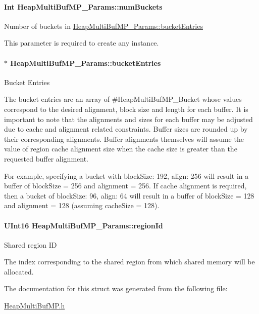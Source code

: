 \paragraph[{num\-Buckets}]{\setlength{\rightskip}{0pt plus 5cm}Int Heap\-Multi\-Buf\-M\-P\-\_\-\-Params\-::num\-Buckets}\label{struct_heap_multi_buf_m_p___params_a30eef328df3b8f69f50a013defb5fbb1}
Number of buckets in \hyperlink{struct_heap_multi_buf_m_p___params_ac130e0ad7fad30d9c759af90984dee8b}{Heap\-Multi\-Buf\-M\-P\-\_\-\-Params\-::bucket\-Entries} \begin{DoxyVerb}   This parameter is required to create any instance.\end{DoxyVerb}
\paragraph[{bucket\-Entries}]{$\ast$ Heap\-Multi\-Buf\-M\-P\-\_\-\-Params\-::bucket\-Entries}\label{struct_heap_multi_buf_m_p___params_ac130e0ad7fad30d9c759af90984dee8b}
Bucket Entries \begin{DoxyVerb}   The bucket entries are an array of #HeapMultiBufMP_Bucket whose values
   correspond to the desired alignment, block size and length for each
   buffer.  It is important to note that the alignments and sizes for each
   buffer may be adjusted due to cache and alignment related constraints.
   Buffer sizes are rounded up by their corresponding alignments.  Buffer
   alignments themselves will assume the value of region cache alignment
   size when the cache size is greater than the requested buffer alignment.

   For example, specifying a bucket with {blockSize: 192, align: 256} will
   result in a buffer of blockSize = 256 and alignment = 256.  If cache
   alignment is required, then a bucket of {blockSize: 96, align: 64} will
   result in a buffer of blockSize = 128 and alignment = 128 (assuming
   cacheSize = 128).\end{DoxyVerb}
\paragraph[{region\-Id}]{\setlength{\rightskip}{0pt plus 5cm}U\-Int16 Heap\-Multi\-Buf\-M\-P\-\_\-\-Params\-::region\-Id}\label{struct_heap_multi_buf_m_p___params_aa3c641a64db9b4ff0c93f9a0c265f8d7}
Shared region I\-D \begin{DoxyVerb}    The index corresponding to the shared region from which shared memory
    will be allocated.\end{DoxyVerb}
 

The documentation for this struct was generated from the following file\-:\begin{DoxyCompactItemize}
\item 
\hyperlink{_heap_multi_buf_m_p_8h}{Heap\-Multi\-Buf\-M\-P.\-h}\end{DoxyCompactItemize}

